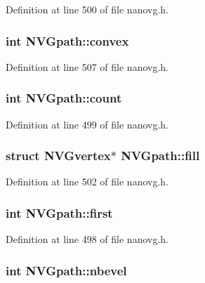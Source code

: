 Definition at line 500 of file nanovg.\+h.

\hypertarget{struct_n_v_gpath_a85833dcd230251fdc7a3f75335c08e8f}{
\subsubsection[{convex}]{\setlength{\rightskip}{0pt plus 5cm}int N\+V\+Gpath\+::convex}}\label{struct_n_v_gpath_a85833dcd230251fdc7a3f75335c08e8f}


Definition at line 507 of file nanovg.\+h.

\hypertarget{struct_n_v_gpath_a65bfb8db6e411e19a2dfc36336e5ed85}{
\subsubsection[{count}]{\setlength{\rightskip}{0pt plus 5cm}int N\+V\+Gpath\+::count}}\label{struct_n_v_gpath_a65bfb8db6e411e19a2dfc36336e5ed85}


Definition at line 499 of file nanovg.\+h.

\hypertarget{struct_n_v_gpath_ae218c0d5d0f90aee93558e51c3279afe}{
\subsubsection[{fill}]{\setlength{\rightskip}{0pt plus 5cm}struct {\bf N\+V\+Gvertex}$\ast$ N\+V\+Gpath\+::fill}}\label{struct_n_v_gpath_ae218c0d5d0f90aee93558e51c3279afe}


Definition at line 502 of file nanovg.\+h.

\hypertarget{struct_n_v_gpath_a6f0776a67e3e60ab285a4e2686f5b45c}{
\subsubsection[{first}]{\setlength{\rightskip}{0pt plus 5cm}int N\+V\+Gpath\+::first}}\label{struct_n_v_gpath_a6f0776a67e3e60ab285a4e2686f5b45c}


Definition at line 498 of file nanovg.\+h.

\hypertarget{struct_n_v_gpath_ac3e9a66a5132bfc42e19694c5548b2fb}{
\subsubsection[{nbevel}]{\setlength{\rightskip}{0pt plus 5cm}int N\+V\+Gpath\+::nbevel}}\label{struct_n_v_gpath_ac3e9a66a5132bfc42e19694c5548b2fb}


